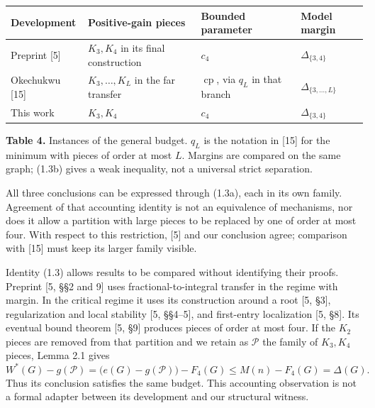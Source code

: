 \documentclass[english,11pt,a4paper]{article}
\newcounter{none}
\begin{document}

{\def\LTcaptype{none} %
\begin{longtable}[c]{@{}
  >{\raggedright\arraybackslash}p{}
  >{\raggedright\arraybackslash}p{}
  >{\raggedright\arraybackslash}p{}
  >{\raggedright\arraybackslash}p{}@{}}
\toprule\noalign{}
\begin{minipage}[b]{\linewidth}\raggedright
Development
\end{minipage} & \begin{minipage}[b]{\linewidth}\raggedright
Positive-gain pieces
\end{minipage} & \begin{minipage}[b]{\linewidth}\raggedright
Bounded parameter
\end{minipage} & \begin{minipage}[b]{\linewidth}\raggedright
Model margin
\end{minipage} \\
\midrule\noalign{}
\endhead
\bottomrule\noalign{}
\endlastfoot
Preprint {[}5{]} & \(K_3,K_4\) in its final construction & \(c_4\) & \(\Delta_{\{3,4\}}\) \\
Okechukwu {[}15{]} & \(K_3,\ldots,K_L\) in the far transfer & \(\operatorname{cp}\), via \(q_L\) in that branch & \(\Delta_{\{3,\ldots,L\}}\) \\
This work & \(K_3,K_4\) & \(c_4\) & \(\Delta_{\{3,4\}}\) \\
\end{longtable}
}

\textbf{Table 4.} Instances of the general budget. \(q_L\) is the notation in {[}15{]} for the minimum with pieces of order at most \(L\). Margins are compared on the same graph; (1.3b) gives a weak inequality, not a universal strict separation.

All three conclusions can be expressed through (1.3a), each in its own family. Agreement of that accounting identity is not an equivalence of mechanisms, nor does it allow a partition with large pieces to be replaced by one of order at most four. With respect to this restriction, {[}5{]} and our conclusion agree; comparison with {[}15{]} must keep its larger family visible.

Identity (1.3) allows results to be compared without identifying their proofs. Preprint {[}5, §§2 and 9{]} uses fractional-to-integral transfer in the regime with margin. In the critical regime it uses its construction around a root {[}5, §3{]}, regularization and local stability {[}5, §§4--5{]}, and first-entry localization {[}5, §8{]}. Its eventual bound theorem {[}5, §9{]} produces pieces of order at most four. If the \(K_2\) pieces are removed from that partition and we retain as \(\mathcal P\) the family of \(K_3,K_4\) pieces, Lemma 2.1 gives \[
W^*(G)-g(\mathcal P)
=\bigl(e(G)-g(\mathcal P)\bigr)-F_4(G)
\le M(n)-F_4(G)=\Delta(G).
\tag{8.1}
\] Thus its conclusion satisfies the same budget. This accounting observation is not a formal adapter between its development and our structural witness.
\end{document}
